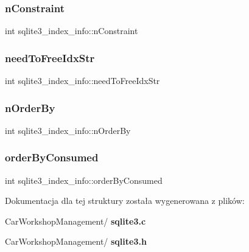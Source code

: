 \mbox{\label{structsqlite3__index__info_ae861993a30ce914a5214eab2579d935a}} 
\subsubsection{nConstraint}
{\footnotesize\ttfamily int sqlite3\+\_\+index\+\_\+info\+::n\+Constraint}

\mbox{\label{structsqlite3__index__info_a5410066c067c3891cdf165c70cc4d6b1}} 
\subsubsection{needToFreeIdxStr}
{\footnotesize\ttfamily int sqlite3\+\_\+index\+\_\+info\+::need\+To\+Free\+Idx\+Str}

\mbox{\label{structsqlite3__index__info_a3ef850fdc57eddbc8189fe84d0a9044e}} 
\subsubsection{nOrderBy}
{\footnotesize\ttfamily int sqlite3\+\_\+index\+\_\+info\+::n\+Order\+By}

\mbox{\label{structsqlite3__index__info_a5515d9de0f37f68d7e0930c20a668b29}} 
\subsubsection{orderByConsumed}
{\footnotesize\ttfamily int sqlite3\+\_\+index\+\_\+info\+::order\+By\+Consumed}



Dokumentacja dla tej struktury została wygenerowana z plików\+:\begin{DoxyCompactItemize}
\item 
Car\+Workshop\+Management/\textbf{ sqlite3.\+c}\item 
Car\+Workshop\+Management/\textbf{ sqlite3.\+h}\end{DoxyCompactItemize}
